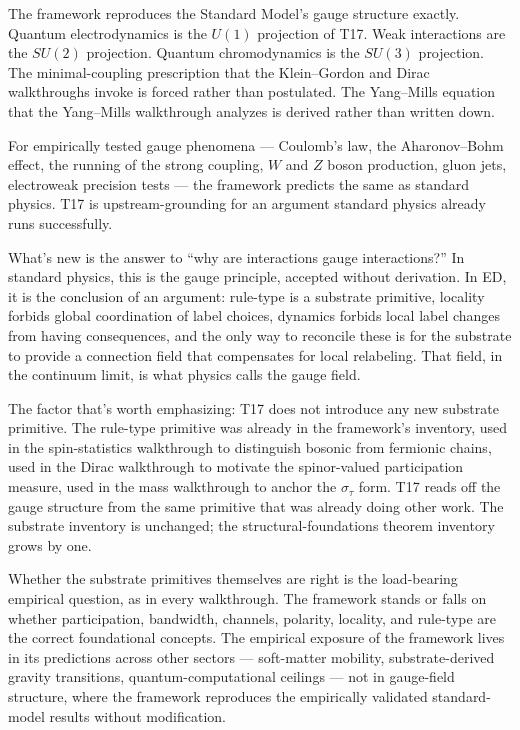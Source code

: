 \documentclass[11pt,a4paper]{article}
\begin{document}
The framework reproduces the Standard Model's gauge structure exactly. Quantum electrodynamics is the $U(1)$ projection of T17. Weak interactions are the $SU(2)$ projection. Quantum chromodynamics is the $SU(3)$ projection. The minimal-coupling prescription that the Klein--Gordon and Dirac walkthroughs invoke is forced rather than postulated. The Yang--Mills equation that the Yang--Mills walkthrough analyzes is derived rather than written down.

For empirically tested gauge phenomena --- Coulomb's law, the Aharonov--Bohm effect, the running of the strong coupling, $W$ and $Z$ boson production, gluon jets, electroweak precision tests --- the framework predicts the same as standard physics. T17 is upstream-grounding for an argument standard physics already runs successfully.

What's new is the answer to ``why are interactions gauge interactions?'' In standard physics, this is the gauge principle, accepted without derivation. In ED, it is the conclusion of an argument: rule-type is a substrate primitive, locality forbids global coordination of label choices, dynamics forbids local label changes from having consequences, and the only way to reconcile these is for the substrate to provide a connection field that compensates for local relabeling. That field, in the continuum limit, is what physics calls the gauge field.

The factor that's worth emphasizing: T17 does not introduce any new substrate primitive. The rule-type primitive was already in the framework's inventory, used in the spin-statistics walkthrough to distinguish bosonic from fermionic chains, used in the Dirac walkthrough to motivate the spinor-valued participation measure, used in the mass walkthrough to anchor the $\sigma_\tau$ form. T17 reads off the gauge structure from the same primitive that was already doing other work. The substrate inventory is unchanged; the structural-foundations theorem inventory grows by one.

Whether the substrate primitives themselves are right is the load-bearing empirical question, as in every walkthrough. The framework stands or falls on whether participation, bandwidth, channels, polarity, locality, and rule-type are the correct foundational concepts. The empirical exposure of the framework lives in its predictions across other sectors --- soft-matter mobility, substrate-derived gravity transitions, quantum-computational ceilings --- not in gauge-field structure, where the framework reproduces the empirically validated standard-model results without modification.
\end{document}
